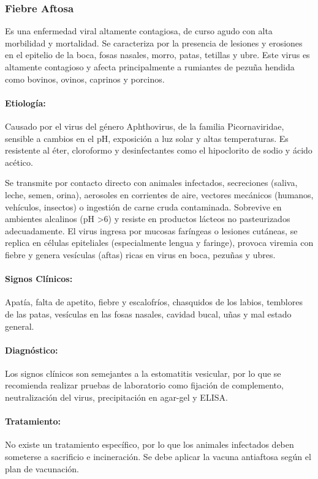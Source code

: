         \subsubsection{Fiebre Aftosa}

            Es una enfermedad viral altamente contagiosa, de curso agudo con alta morbilidad y mortalidad. Se caracteriza por la presencia de lesiones y erosiones en el epitelio de la boca, fosas nasales, morro, patas, tetillas y ubre. Este virus es altamente contagioso y afecta principalmente a rumiantes de pezuña hendida como bovinos, ovinos, caprinos y porcinos.

            \paragraph{Etiología:} Causado por el virus del género Aphthovirus, de la familia Picornaviridae, sensible a cambios en el pH, exposición a luz solar y altas temperaturas. Es resistente al éter, cloroformo y desinfectantes como el hipoclorito de sodio y ácido acético.

            Se transmite por contacto directo con animales infectados, secreciones (saliva, leche, semen, orina), aerosoles en corrientes de aire, vectores mecánicos (humanos, vehículos, insectos) o ingestión de carne cruda contaminada. Sobrevive en ambientes alcalinos (pH >6) y resiste en productos lácteos no pasteurizados adecuadamente. El virus ingresa por mucosas faríngeas o lesiones cutáneas, se replica en células epiteliales (especialmente lengua y faringe), provoca viremia con fiebre y genera vesículas (aftas) ricas en virus en boca, pezuñas y ubres.

            \paragraph{Signos Clínicos:} Apatía, falta de apetito, fiebre y escalofríos, chasquidos de los labios, temblores de las patas, vesículas en las fosas nasales, cavidad bucal, uñas y mal estado general.

            \paragraph{Diagnóstico:} Los signos clínicos son semejantes a la estomatitis vesicular, por lo que se recomienda realizar pruebas de laboratorio como fijación de complemento, neutralización del virus, precipitación en agar-gel y ELISA.

            \paragraph{Tratamiento:} No existe un tratamiento específico, por lo que los animales infectados deben someterse a sacrificio e incineración. Se debe aplicar la vacuna antiaftosa según el plan de vacunación. 

